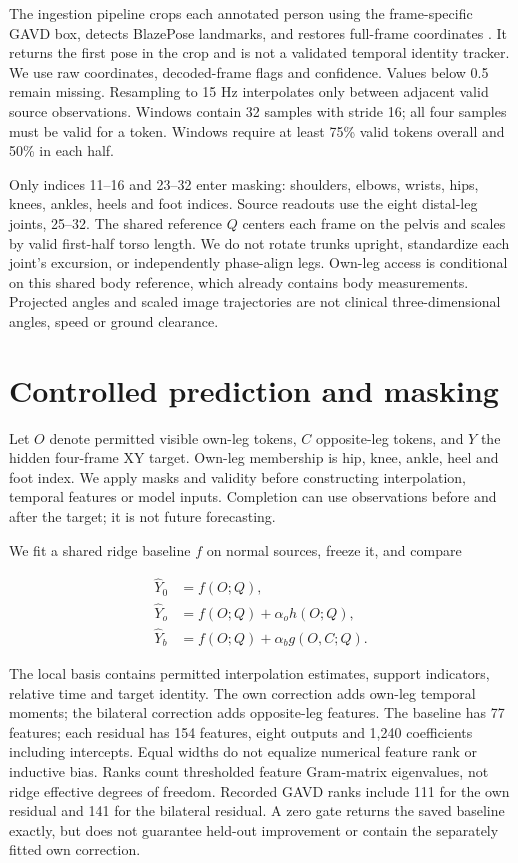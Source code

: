 \documentclass[letterpaper]{article}
\begin{document}
The ingestion pipeline crops each annotated person using the frame-specific GAVD box, detects BlazePose landmarks, and restores full-frame coordinates \citep{bazarevsky2020blazepose}. It returns the first pose in the crop and is not a validated temporal identity tracker. We use raw coordinates, decoded-frame flags and confidence. Values below 0.5 remain missing. Resampling to 15 Hz interpolates only between adjacent valid source observations. Windows contain 32 samples with stride 16; all four samples must be valid for a token. Windows require at least 75\% valid tokens overall and 50\% in each half.

Only indices 11--16 and 23--32 enter masking: shoulders, elbows, wrists, hips, knees, ankles, heels and foot indices. Source readouts use the eight distal-leg joints, 25--32. The shared reference \(Q\) centers each frame on the pelvis and scales by valid first-half torso length. We do not rotate trunks upright, standardize each joint's excursion, or independently phase-align legs. Own-leg access is conditional on this shared body reference, which already contains body measurements. Projected angles and scaled image trajectories are not clinical three-dimensional angles, speed or ground clearance.

\section{Controlled prediction and masking}

Let \(O\) denote permitted visible own-leg tokens, \(C\) opposite-leg tokens, and \(Y\) the hidden four-frame XY target. Own-leg membership is hip, knee, ankle, heel and foot index. We apply masks and validity before constructing interpolation, temporal features or model inputs. Completion can use observations before and after the target; it is not future forecasting.

We fit a shared ridge baseline \(f\) on normal sources, freeze it, and compare

\begin{align}
\widehat Y_0 &= f(O;Q),\\
\widehat Y_o &= f(O;Q)+\alpha_o h(O;Q),\\
\widehat Y_b &= f(O;Q)+\alpha_b g(O,C;Q).
\end{align}

The local basis contains permitted interpolation estimates, support indicators, relative time and target identity. The own correction adds own-leg temporal moments; the bilateral correction adds opposite-leg features. The baseline has 77 features; each residual has 154 features, eight outputs and 1,240 coefficients including intercepts. Equal widths do not equalize numerical feature rank or inductive bias. Ranks count thresholded feature Gram-matrix eigenvalues, not ridge effective degrees of freedom. Recorded GAVD ranks include 111 for the own residual and 141 for the bilateral residual. A zero gate returns the saved baseline exactly, but does not guarantee held-out improvement or contain the separately fitted own correction.
\end{document}
